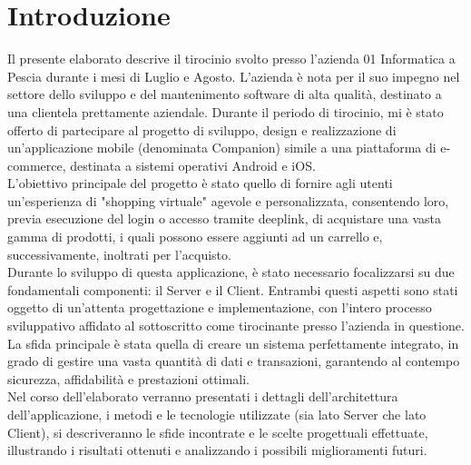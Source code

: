 \chapter{Introduzione}
Il presente elaborato descrive il tirocinio svolto presso l'azienda 01 Informatica\cite{01info} a Pescia durante i mesi di Luglio e Agosto. L'azienda è nota per il suo impegno nel settore dello sviluppo e del mantenimento software di alta qualità, destinato a una clientela prettamente aziendale. Durante il periodo di tirocinio, mi è stato offerto di partecipare al progetto di sviluppo, design e realizzazione di un'applicazione mobile (denominata Companion) simile a una piattaforma di e-commerce, destinata a sistemi operativi Android e iOS.\\
L'obiettivo principale del progetto è stato quello di fornire agli utenti un'esperienza di "shopping virtuale" agevole e personalizzata, consentendo loro, previa esecuzione del login o accesso tramite deeplink, di acquistare una vasta gamma di prodotti, i quali possono essere aggiunti ad un carrello e, successivamente, inoltrati per l'acquisto.\\
Durante lo sviluppo di questa applicazione, è stato necessario focalizzarsi su due fondamentali componenti: il Server e il Client. Entrambi questi aspetti sono stati oggetto di un'attenta progettazione e implementazione, con l'intero processo sviluppativo affidato al sottoscritto come tirocinante presso l'azienda in questione. La sfida principale è stata quella di creare un sistema perfettamente integrato, in grado di gestire una vasta quantità di dati e transazioni, garantendo al contempo sicurezza, affidabilità e prestazioni ottimali.\\
Nel corso dell'elaborato verranno presentati i dettagli dell'architettura dell'applicazione, i metodi e le tecnologie utilizzate (sia lato Server che lato Client), si descriveranno le sfide incontrate e le scelte progettuali effettuate, illustrando i risultati ottenuti e analizzando i possibili miglioramenti futuri.

